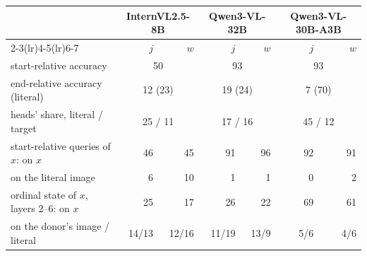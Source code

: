 \begin{tabular}{lrrrrrr}
\toprule
 & \multicolumn{2}{c}{InternVL2.5-8B} & \multicolumn{2}{c}{Qwen3-VL-32B} & \multicolumn{2}{c}{Qwen3-VL-30B-A3B} \\
\cmidrule(lr){2-3}\cmidrule(lr){4-5}\cmidrule(lr){6-7}
 & $j$ & $w$ & $j$ & $w$ & $j$ & $w$ \\
\midrule
start-relative accuracy & \multicolumn{2}{c}{50} & \multicolumn{2}{c}{93} & \multicolumn{2}{c}{93} \\
end-relative accuracy (literal) & \multicolumn{2}{c}{12 (23)} & \multicolumn{2}{c}{19 (24)} & \multicolumn{2}{c}{7 (70)} \\
heads' share, literal / target & \multicolumn{2}{c}{25 / 11} & \multicolumn{2}{c}{17 / 16} & \multicolumn{2}{c}{45 / 12} \\
\midrule
start-relative queries of $x$: on $x$ & 46 & 45 & 91 & 96 & 92 & 91 \\
\quad on the literal image & 6 & 10 & 1 & 1 & 0 & 2 \\
ordinal state of $x$, layers 2--6: on $x$ & 25 & 17 & 26 & 22 & 69 & 61 \\
\quad on the donor's image / literal & 14/13 & 12/16 & 11/19 & 13/9 & 5/6 & 4/6 \\
\bottomrule
\end{tabular}
